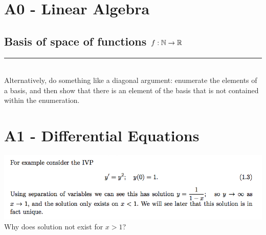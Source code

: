 \documentclass[12pt]{article}
\begin{document}
\section{A0 - Linear Algebra}
\subsection{Basis of space of functions $f:\mathbb{N} \to \mathbb{R}$}

\hrule
~\\
Alternatively, do something like a diagonal argument: enumerate the elements of
a basis, and then show that there is an element of the basis that is not
contained within the enumeration.


\section{A1 - Differential Equations}

\includegraphics[width=400pt]{img/question-differential-equations-a1-warning.png}\\

Why does solution not exist for $x > 1$?
\end{document}
